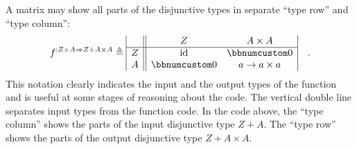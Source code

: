 A matrix may show all parts of the disjunctive types in separate \textsf{``}type
row\textsf{''} and \textsf{``}type column\textsf{''}:
\begin{equation}
f^{:Z+A\Rightarrow Z+A\times A}\triangleq\begin{array}{|c||cc|}
 & Z & A\times A\\
\hline Z & \text{id} & \bbnum 0\\
A & \bbnum 0 & a\rightarrow a\times a
\end{array}\quad.
\end{equation}
This notation clearly indicates the input and the output types of
the function and is useful at some stages of reasoning about the code.
The vertical double line separates input types from the function code.
In the code above, the \textsf{``}type column\textsf{''} shows the parts of the input
disjunctive type $Z+A$. The \textsf{``}type row\textsf{''} shows the parts of the
output disjunctive type $Z+A\times A$.

